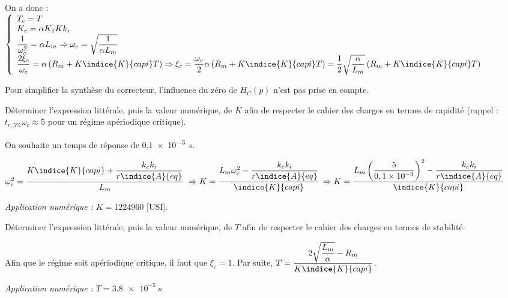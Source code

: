 \begin{corrige}
On a donc : 
$
\left\{
\begin{array}{l}
T_c = T \\
K_c = \alpha K_1 Kk_i  \\
\dfrac{1}{\omega_c^2} = \alpha L_m \Rightarrow  \omega_c = \sqrt{\dfrac{1}{\alpha L_m}} \\
\dfrac{2 \xi_c}{\omega_c} = \alpha\left(R_m+  K\indice{K}{capi}T\right) 
\Rightarrow  \xi_c = \dfrac{\omega_c}{2}\alpha\left(R_m+  K\indice{K}{capi}T\right) = \dfrac{1}{2}\sqrt{\dfrac{\alpha}{ L_m}} \left(R_m+  K\indice{K}{capi}T\right)  \\
\end{array}
\right.
$

\end{corrige}
\else
\fi


Pour simplifier la synthèse du correcteur, l'influence du zéro de $H_{C}(p)$ n'est pas prise en compte.\\

\begin{question}%
\label{2023_ccs_psi_q_17}
Déterminer l'expression littérale, puis la valeur numérique, de $K$ afin de respecter le cahier des charges en termes de rapidité (rappel : $t_{r, 5 \%} \omega_{c} \approx 5$ pour un régime apériodique critique).\\
\end{question}
\ifprof
\begin{corrige}
On souhaite un temps de réponse de \SI{0,1e-3}{s}. 

$\omega_c^2  = \dfrac{K\indice{K}{capi}+\dfrac{k_e k_i}{r\indice{A}{eq}}}{L_m} $
$\Rightarrow K = \dfrac{L_m\omega_c^2 - \dfrac{k_e k_i}{r\indice{A}{eq}}}{\indice{K}{capi}}$
$\Rightarrow K = \dfrac{L_m\left(\dfrac{5}{0,1 \times 10^{-3}} \right)^2 - \dfrac{k_e k_i}{r\indice{A}{eq}}}{\indice{K}{capi}}$

\textit{Application numérique : } $K=1224960$ [USI].

\end{corrige}
\else
\fi


\begin{question}
\label{2023_ccs_psi_q_18}
Déterminer l'expression littérale, puis la valeur numérique, de $T$ afin de respecter le cahier des charges en termes de stabilité.\\
\end{question}
\ifprof
\begin{corrige}
Afin que le régime soit apériodique critique, il faut que $\xi_c = 1$. 
Par suite, $    T = \dfrac{2\sqrt{\dfrac{ L_m}{\alpha}} - R_m }{K\indice{K}{capi}} $.

\textit{Application numérique : } $T=\SI{3,8e-5}{s}$.
\end{corrige}
\else
\fi

